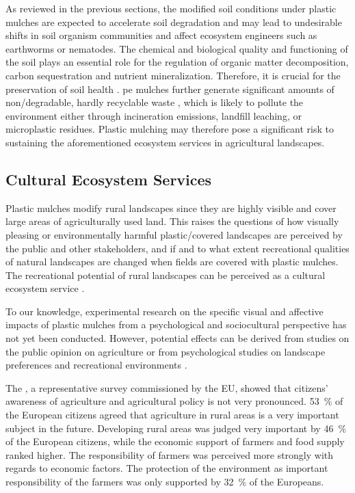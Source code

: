 As reviewed in the previous sections, the modified soil conditions under plastic mulches are expected to accelerate soil degradation and may lead to undesirable shifts in soil organism communities and affect ecosystem engineers such as earthworms or nematodes. The chemical and biological quality and functioning of the soil plays an essential role for the regulation of organic matter decomposition, carbon sequestration and nutrient mineralization. Therefore, it is crucial for the preservation of soil health \citep{StorkInvertebrates1992}. \ac{pe} mulches further generate significant amounts of non\-/degradable, hardly recyclable waste \citep[see discussion further above and][]{DelgadoTechnological2006}, which is likely to pollute the environment either through incineration emissions, landfill leaching, or microplastic residues. Plastic mulching may therefore pose a significant risk to sustaining the aforementioned ecosystem services in agricultural landscapes.

\subsection{Cultural Ecosystem Services}

Plastic mulches modify rural landscapes since they are highly visible and cover large areas of agriculturally used land. This raises the questions of how visually pleasing or environmentally harmful plastic\-/covered landscapes are perceived by the public and other stakeholders, and if and to what extent recreational qualities of natural landscapes are changed when fields are covered with plastic mulches. The recreational potential of rural landscapes can be perceived as a cultural ecosystem service \citep{UlrichHuman1986}.

To our knowledge, experimental research on the specific visual and affective impacts of plastic mulches from a psychological and sociocultural perspective has not yet been conducted. However, potential effects can be derived from studies on the public opinion on agriculture \citep{SpecialEurobarometer410Europeans2014} or from psychological studies on landscape preferences and recreational environments \citep{StegEnvironmental2012}.

The \citet{SpecialEurobarometer410Europeans2014}, a representative survey commissioned by the EU, showed that citizens' awareness of agriculture and agricultural policy is not very pronounced. \SI{53}{\percent} of the European citizens agreed that agriculture in rural areas is a very important subject in the future. Developing rural areas was judged very important by \SI{46}{\percent} of the European citizens, while the economic support of farmers and food supply ranked higher. The responsibility of farmers was perceived more strongly with regards to economic factors. The protection of the environment as important responsibility of the farmers was only supported by \SI{32}{\percent} of the Europeans.

